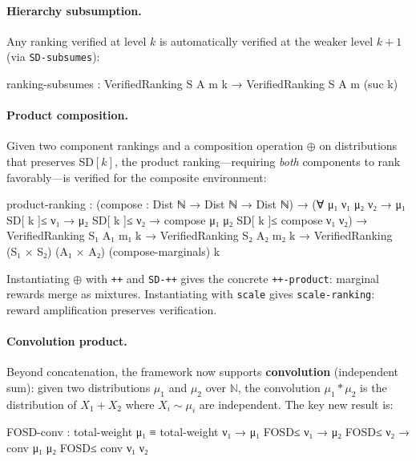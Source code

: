 \documentclass[9pt,a4paper]{article}
\theoremstyle{plain}
\theoremstyle{definition}
\theoremstyle{remark}
\begin{document}
\paragraph{Hierarchy subsumption.}  Any ranking verified at level $k$ is automatically verified at the weaker level $k{+}1$ (via \texttt{SD-subsumes}):

\begin{spec}
  ranking-subsumes : VerifiedRanking S A m k → VerifiedRanking S A m (suc k)
\end{spec}

\paragraph{Product composition.}  Given two component rankings and a composition operation $\oplus$ on distributions that preserves SD$[k]$, the product ranking---requiring \emph{both} components to rank favorably---is verified for the composite environment:

\begin{spec}
  product-ranking :
    (compose : Dist ℕ → Dist ℕ → Dist ℕ) →
    (∀ {μ₁ ν₁ μ₂ ν₂} → μ₁ SD[ k ]≤ ν₁ → μ₂ SD[ k ]≤ ν₂ →
      compose μ₁ μ₂ SD[ k ]≤ compose ν₁ ν₂) →
    VerifiedRanking S₁ A₁ m₁ k → VerifiedRanking S₂ A₂ m₂ k →
    VerifiedRanking (S₁ × S₂) (A₁ × A₂) (compose-marginals) k
\end{spec}

\noindent Instantiating $\oplus$ with \texttt{++} and \texttt{SD-++} gives the concrete \texttt{++-product}: marginal rewards merge as mixtures.  Instantiating with \texttt{scale} gives \texttt{scale-ranking}: reward amplification preserves verification.

\paragraph{Convolution product.}
Beyond concatenation, the framework now supports \textbf{convolution} (independent sum): given two distributions $\mu_1$ and $\mu_2$ over $\mathbb{N}$, the convolution $\mu_1 * \mu_2$ is the distribution of $X_1 + X_2$ where $X_i \sim \mu_i$ are independent.  The key new result is:

\begin{spec}
  FOSD-conv : total-weight μ₁ ≡ total-weight ν₁ →
    μ₁ FOSD≤ ν₁ → μ₂ FOSD≤ ν₂ →
    conv μ₁ μ₂ FOSD≤ conv ν₁ ν₂
\end{spec}
\end{document}
